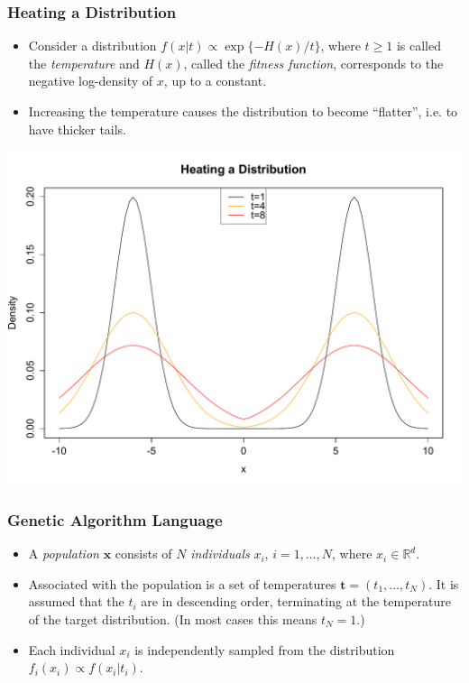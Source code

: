 \documentclass{beamer}\usepackage[]{graphicx}\usepackage[]{color}
\newcommand{\bt}{\mathbf t}
\begin{document}
\begin{frame}
  \frametitle{Heating a Distribution}
  \begin{itemize}
  \item Consider a distribution $f(x|t) \propto \exp\{
    -H(x)/t \}$, where $t\ge 1$ is called the \emph{temperature} and
    $H(x)$, called the \emph{fitness function}, corresponds to the
    negative log-density of $x$, up to a constant.
  \item Increasing the temperature causes the distribution to become
    ``flatter'', i.e. to have thicker tails.
  \end{itemize}
\end{frame}

\begin{frame}
  \begin{center}
  \includegraphics[scale=0.4]{figure/heat.pdf}    
  \end{center}
\end{frame}

\begin{frame}
  \frametitle{Genetic Algorithm Language}
  \begin{itemize}
  \item A \emph{population} $\mathbf{x}$ consists of $N$
    \emph{individuals} $x_i$, $i = 1, \ldots, N$, where $x_i \in
    \mathbb{R}^d$.
  \item Associated with the population is a set of temperatures $\bt
    = (t_1,\ldots,t_N)$. It is assumed that the $t_i$ are in
    descending order, terminating at the temperature of the target
    distribution. (In most cases this means $t_N =1$.)
  \item Each individual $x_i$ is independently sampled from the
    distribution $f_i(x_i) \propto f(x_i|t_i)$.
  \end{itemize}
\end{frame}
\end{document}
